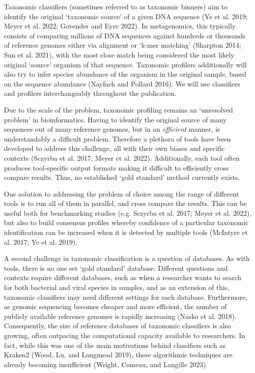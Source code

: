 \documentclass[
]{article}
\begin{document}
Taxonomic classifiers (sometimes referred to as taxonomic binners) aim
to identify the original `taxonomic source' of a given DNA sequence (Ye
et al. 2019; Meyer et al. 2022; Govender and Eyre 2022). In
metagenomics, this typically consists of comparing millions of DNA
sequences against hundreds or thousands of reference genomes either via
alignment or `k-mer matching' (Sharpton 2014; Sun et al. 2021), with the
most close match being considered the most likely original `source'
organism of that sequence. Taxonomic profilers additionally will also
try to infer species abundance of the organism in the original sample,
based on the sequence abundance (Nayfach and Pollard 2016). We will use
classifiers and profilers interchangeably throughout the publication.

Due to the scale of the problem, taxonomic profiling remains an
`unresolved problem' in bioinformatics. Having to identify the original
source of many sequences out of many reference genomes, but in an
\emph{efficient} manner, is understandably a difficult problem.
Therefore a plethora of tools have been developed to address this
challenge, all with their own biases and specific contexts (Sczyrba et
al. 2017; Meyer et al. 2022). Additionally, each tool often produces
tool-specific output formats making it difficult to efficiently cross
compare results. Thus, no established `gold standard' method currently
exists.

One solution to addressing the problem of choice among the range of
different tools is to run all of them in parallel, and cross compare the
results. This can be useful both for benchmarking studies (e.g. Sczyrba
et al. 2017; Meyer et al. 2022), but also to build consensus profiles
whereby confidence of a particular taxonomic identification can be
increased when it is detected by multiple tools (McIntyre et al. 2017;
Ye et al. 2019).

A second challenge in taxonomic classification is a question of
databases. As with tools, there is no one set `gold standard' database.
Different questions and contexts require different databases, such as
when a researcher wants to search for both bacterial and viral species
in samples, and as an extension of this, taxonomic classifiers may need
different settings for each database. Furthermore, as genomic sequencing
becomes cheaper and more efficient, the number of publicly available
reference genomes is rapidly increasing (Nasko et al. 2018).
Consequently, the size of reference databases of taxonomic classifiers
is also growing, often outpacing the computational capacity available to
researchers. In fact, while this was one of the main motivations behind
classifiers such as Kraken2 (Wood, Lu, and Langmead 2019), these
algorithmic techniques are already becoming insufficient (Wright,
Comeau, and Langille 2023).
\end{document}
